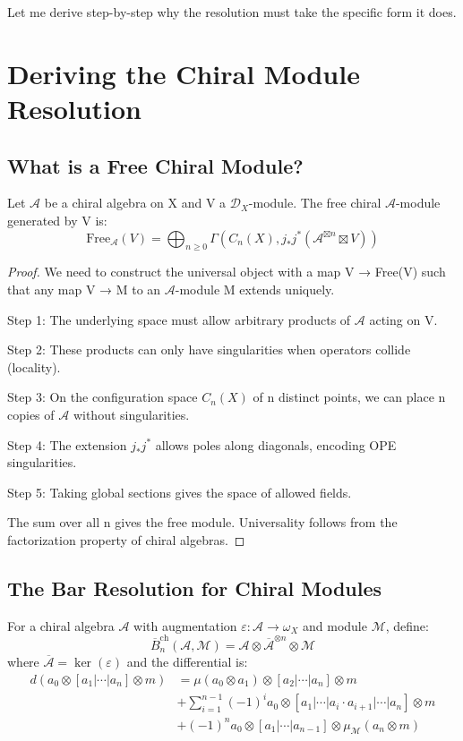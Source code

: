 Let me derive step-by-step why the resolution must take the specific form it does.

\section{Deriving the Chiral Module Resolution}

\subsection{What is a Free Chiral Module?}

\begin{lemma}
Let $\mathcal{A}$ be a chiral algebra on X and V a $\mathcal{D}_X$-module. The free chiral $\mathcal{A}$-module generated by V is:
\[
\text{Free}_{\mathcal{A}}(V) = \bigoplus_{n \geq 0} \Gamma(C_n(X), j_*j^*(\mathcal{A}^{\boxtimes n} \boxtimes V))
\]
\end{lemma}

\begin{proof}
We need to construct the universal object with a map V → Free(V) such that any map V → M to an $\mathcal{A}$-module M extends uniquely.

Step 1: The underlying space must allow arbitrary products of $\mathcal{A}$ acting on V.

Step 2: These products can only have singularities when operators collide (locality).

Step 3: On the configuration space $C_n(X)$ of n distinct points, we can place n copies of $\mathcal{A}$ without singularities.

Step 4: The extension $j_*j^*$ allows poles along diagonals, encoding OPE singularities.

Step 5: Taking global sections gives the space of allowed fields.

The sum over all n gives the free module. Universality follows from the factorization property of chiral algebras.
\end{proof}

\subsection{The Bar Resolution for Chiral Modules}

\begin{definition}
For a chiral algebra $\mathcal{A}$ with augmentation $\varepsilon: \mathcal{A} \to \omega_X$ and module $\mathcal{M}$, define:
\[
\overline{B}_n^{\text{ch}}(\mathcal{A}, \mathcal{M}) = \mathcal{A} \otimes \overline{\mathcal{A}}^{\otimes n} \otimes \mathcal{M}
\]
where $\overline{\mathcal{A}} = \ker(\varepsilon)$ and the differential is:
\begin{align}
d(a_0 \otimes [a_1|\cdots|a_n] \otimes m) &= \mu(a_0 \otimes a_1) \otimes [a_2|\cdots|a_n] \otimes m \\
&+ \sum_{i=1}^{n-1} (-1)^i a_0 \otimes [a_1|\cdots|a_i \cdot a_{i+1}|\cdots|a_n] \otimes m \\
&+ (-1)^n a_0 \otimes [a_1|\cdots|a_{n-1}] \otimes \mu_{\mathcal{M}}(a_n \otimes m)
\end{align}
\end{definition}


